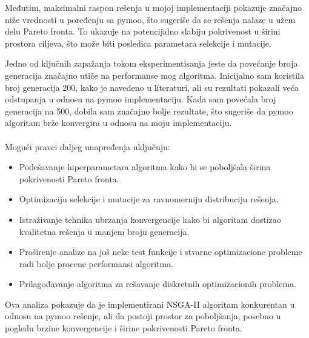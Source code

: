 \documentclass[12pt]{article}
\begin{document}
Međutim, maksimalni raspon rešenja u mojoj implementaciji pokazuje značajno niže vrednosti u poređenju sa pymoo, što sugeriše da se rešenja nalaze u užem delu Pareto fronta. To ukazuje na potencijalno slabiju pokrivenost u širini prostora ciljeva, što može biti posledica parametara selekcije i mutacije.

Jedno od ključnih zapažanja tokom eksperimentisanja jeste da povećanje broja generacija značajno utiče na performanse mog algoritma. Inicijalno sam koristila broj generacija 200, kako je navedeno u literaturi, ali su rezultati pokazali veća odstupanja u odnosu na pymoo implementaciju. Kada sam povećala broj generacija na 500, dobila sam značajno bolje rezultate, što sugeriše da pymoo algoritam brže konvergira u odnosu na moju implementaciju.
\\
\\
Mogući pravci daljeg unapređenja uključuju:

\begin{itemize}
    \item Podešavanje hiperparametara algoritma kako bi se poboljšala širina pokrivenosti Pareto fronta.
    \item Optimizaciju selekcije i mutacije za ravnomerniju distribuciju rešenja.
    \item Istraživanje tehnika ubrzanja konvergencije kako bi algoritam dostizao kvalitetna rešenja u manjem broju generacija.
    \item Proširenje analize na još neke test funkcije i stvarne optimizacione probleme radi bolje procene performansi algoritma.
	\item Prilagođavanje algoritma za rešavanje diskretnih optimizacionih problema.
\end{itemize}

Ova analiza pokazuje da je implementirani NSGA-II algoritam konkurentan u odnosu na pymoo rešenje, ali da postoji prostor za poboljšanja, posebno u pogledu brzine konvergencije i širine pokrivenosti Pareto fronta.
\end{document}

